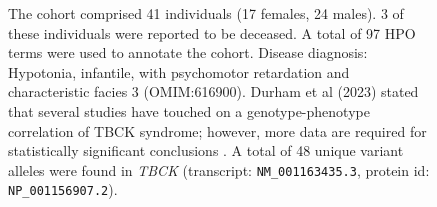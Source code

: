 \begin{figure}[htbp]
\vspace{2em}

\caption{ The cohort comprised 41 individuals (17 females, 24 males). 3 of these individuals were reported to be deceased. A total of 97 HPO terms were used to annotate the cohort. 
Disease diagnosis: Hypotonia, infantile, with psychomotor retardation and characteristic facies 3 (OMIM:616900). 
Durham et al (2023) stated that several studies have touched on a genotype-phenotype correlation of TBCK syndrome; however, more data are required for statistically significant conclusions \cite{PMID_37455236}. 
A total of 48 unique variant alleles were found in \textit{TBCK} (transcript: \texttt{NM\_001163435.3}, protein id: \texttt{NP\_001156907.2}).}
\end{figure}

